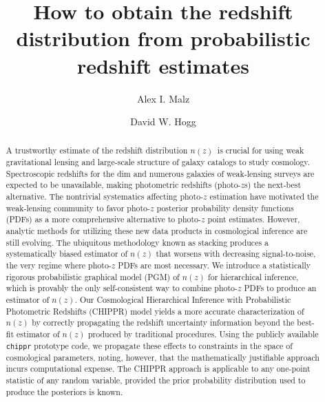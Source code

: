 \documentclass[iop]{emulateapj}
\newcommand{\project}[1]{\textsc{#1}}
\newcommand{\Chippr}{\project{CHIPPR}}%
\newcommand{\nz}{$n(z)$}
\begin{document}

\title{How to obtain the redshift distribution from probabilistic redshift estimates}

\author{Alex I. Malz}
\author{David W. Hogg}


\begin{abstract}
A trustworthy estimate of the redshift distribution \nz\ is crucial for using weak gravitational lensing and large-scale structure of galaxy catalogs to study cosmology.
Spectroscopic redshifts for the dim and numerous galaxies of weak-lensing surveys are expected to be unavailable, making photometric redshifts (photo-$z$s) the next-best alternative.
The nontrivial systematics affecting photo-$z$ estimation have motivated the weak-lensing community to favor photo-$z$ posterior probability density functions (PDFs) as a more comprehensive alternative to photo-$z$ point estimates.
However, analytic methods for utilizing these new data products in cosmological inference are still evolving.
The ubiquitous methodology known as stacking produces a systematically biased estimator of $n(z)$ that worsens with decreasing signal-to-noise, the very regime where photo-$z$ PDFs are most necessary.
We introduce a statistically rigorous probabilistic graphical model (PGM) of $n(z)$ for hierarchical inference, which is provably the only self-consistent way to combine photo-$z$ PDFs to produce an estimator of $n(z)$.
Our Cosmological Hierarchical Inference with Probabilistic Photometric Redshifts (\Chippr) model yields a more accurate characterization of $n(z)$ by correctly propagating the redshift uncertainty information beyond the best-fit estimator of $n(z)$ produced by traditional procedures.
Using the publicly available \texttt{chippr} prototype code, we propagate these effects to constraints in the space of cosmological parameters, noting, however, that the mathematically justifiable approach incurs computational expense.
The CHIPPR approach is applicable to any one-point statistic of any random variable, provided the prior probability distribution used to produce the posteriors is known.
\end{abstract}
\end{document}

